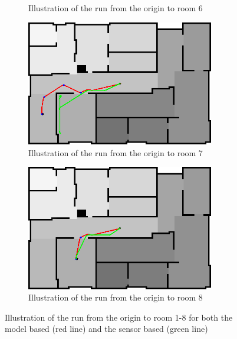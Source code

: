 \documentclass[../Head/Main.tex]{subfiles}
\begin{document}
\begin{figure}[H]
\begin{subfigure}[b]{0.49\textwidth}
    \caption{Illustration of the run from the origin to room 6}
    \label{fig:Test6}
  \end{subfigure}
  \hfill
  \begin{subfigure}[b]{0.49\textwidth}
    \centering
    \includegraphics[width=0.9\textwidth]{brushfireAndBugTest7}
    \caption{Illustration of the run from the origin to room 7}
    \label{fig:Test7}
  \end{subfigure}
  \begin{subfigure}[b]{0.49\textwidth}
    \centering
    \includegraphics[width=0.9\textwidth]{brushfireAndBugTest8}
    \caption{Illustration of the run from the origin to room 8}
    \label{fig:Test8}
  \end{subfigure}
  \caption{Illustration of the run from the origin to room 1-8 for both the model based (red line) and the sensor based (green line)}
\end{figure}
\end{document}
